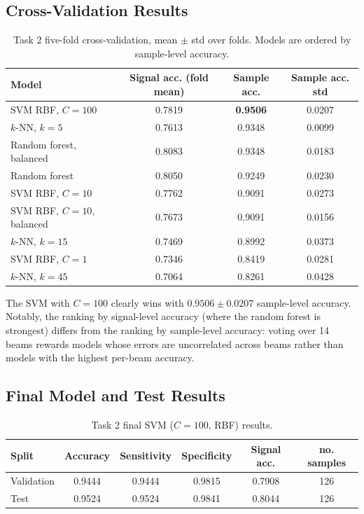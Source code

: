 \documentclass[11pt]{article}
\begin{document}
\subsection{Cross-Validation Results}

\begin{table}[htbp]
\centering
\caption{Task 2 five-fold cross-validation, mean $\pm$ std over folds. Models
are ordered by sample-level accuracy.}
\label{tab:t2cv}
\small
\begin{tabular}{lccc}
\toprule
Model & Signal acc. (fold mean) & Sample acc. & Sample acc. std\\
\midrule
SVM RBF, $C=100$ & 0.7819 & \textbf{0.9506} & 0.0207\\
$k$-NN, $k=5$ & 0.7613 & 0.9348 & 0.0099\\
Random forest, balanced & 0.8083 & 0.9348 & 0.0183\\
Random forest & 0.8050 & 0.9249 & 0.0230\\
SVM RBF, $C=10$ & 0.7762 & 0.9091 & 0.0273\\
SVM RBF, $C=10$, balanced & 0.7673 & 0.9091 & 0.0156\\
$k$-NN, $k=15$ & 0.7469 & 0.8992 & 0.0373\\
SVM RBF, $C=1$ & 0.7346 & 0.8419 & 0.0281\\
$k$-NN, $k=45$ & 0.7064 & 0.8261 & 0.0428\\
\bottomrule
\end{tabular}
\end{table}

The SVM with $C=100$ clearly wins with $0.9506 \pm 0.0207$ sample-level
accuracy. Notably, the ranking by signal-level accuracy (where the random
forest is strongest) differs from the ranking by sample-level accuracy: voting
over 14 beams rewards models whose errors are uncorrelated across beams rather
than models with the highest per-beam accuracy.

\subsection{Final Model and Test Results}

\begin{table}[htbp]
\centering
\caption{Task 2 final SVM ($C=100$, RBF) results.}
\label{tab:t2res}
\small
\begin{tabular}{lccccc}
\toprule
Split & Accuracy & Sensitivity & Specificity & Signal acc. & no. samples\\
\midrule
Validation & 0.9444 & 0.9444 & 0.9815 & 0.7908 & 126\\
Test & 0.9524 & 0.9524 & 0.9841 & 0.8044 & 126\\
\bottomrule
\end{tabular}
\end{table}
\end{document}

